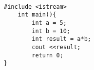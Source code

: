 \lstset{ 
	extendedchars=true,              %
	keepspaces=true,                 %
	language=[11]C++,                 %
	showstringspaces=false
}
\begin{lstlisting}[frame=single, caption={Multiplication}]  % Start your code-block

#include <istream>
	int main(){
		int a = 5;
		int b = 10;
		int result = a*b;
		cout <<result;
		return 0;
}
\end{lstlisting}